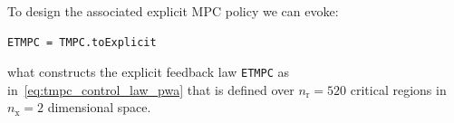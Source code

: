 \documentclass[letterpaper, 10 pt, conference]{ieeeconf}
\begin{document}
To design the associated explicit MPC policy we can evoke:
\begin{lstlisting}[style=Matlab-editor]
	ETMPC = TMPC.toExplicit
\end{lstlisting}
what constructs the explicit feedback law \verb|ETMPC| as in~\eqref{eq:tmpc_control_law_pwa} that is defined over $n_\text{r} = 520$ critical regions in $n_\text{x} = 2$ dimensional space.


%

\end{document}

